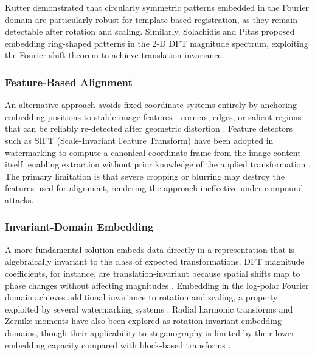 \documentclass[12pt,a4paper,oneside]{report}
\begin{document}
	Kutter \cite{kutter1999digital} demonstrated that circularly symmetric patterns embedded in the
	Fourier domain are particularly robust for template-based registration, as they remain
	detectable after rotation and scaling.
	Similarly, Solachidis and Pitas \cite{solachidis2004fourier} proposed embedding ring-shaped
	patterns in the 2-D DFT magnitude spectrum, exploiting the Fourier shift theorem to
	achieve translation invariance.
	
	\subsubsection{Feature-Based Alignment}
	
	An alternative approach avoids fixed coordinate systems entirely by anchoring embedding
	positions to stable image features—corners, edges, or salient regions—that can be
	reliably re-detected after geometric distortion \cite{ruanaidh1998rotation}.
	Feature detectors such as SIFT (Scale-Invariant Feature Transform) have been adopted in
	watermarking to compute a canonical coordinate frame from the image content itself,
	enabling extraction without prior knowledge of the applied transformation
	\cite{petitcolas1999information, cox2007}.
	The primary limitation is that severe cropping or blurring may destroy the features
	used for alignment, rendering the approach ineffective under compound attacks.
	
	\subsubsection{Invariant-Domain Embedding}
	
	A more fundamental solution embeds data directly in a representation that is
	algebraically invariant to the class of expected transformations.
	DFT magnitude coefficients, for instance, are translation-invariant because spatial
	shifts map to phase changes without affecting magnitudes \cite{oppenheim1981importance}.
	Embedding in the log-polar Fourier domain achieves additional invariance to rotation and
	scaling, a property exploited by several watermarking systems \cite{ruanaidh1998rotation,
		solachidis2001circularly}.
	Radial harmonic transforms and Zernike moments have also been explored as rotation-invariant
	embedding domains, though their applicability to steganography is limited by their lower
	embedding capacity compared with block-based transforms \cite{petitcolas1999information}.
	
\end{document}

